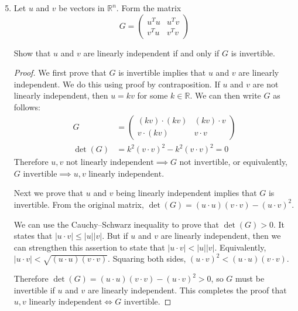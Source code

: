 \documentclass{article}
\newcommand{\Real}{\mathbb{R}}
\begin{document}
\begin{enumerate}

\setcounter{enumi}{4}
\item Let $u$ and $v$ be vectors in $\Real^n$. Form the matrix
\[ G = \left(
\begin{array}{cc}
u^T u & u^T v \\
v^T u & v^T v
\end{array}
\right) \]

Show that $u$ and $v$ are linearly independent if and only if $G$ is invertible.

\begin{proof}
We first prove that $G$ is invertible implies that $u$ and $v$ are linearly independent. We do this using proof by contraposition. If $u$ and $v$ are not linearly independent, then $u = kv$ for some $k \in \Real$. We can then write $G$ as follows:
\begin{align*}
G &= \left(
\begin{array}{cc}
(kv) \cdot (kv) & (kv) \cdot v \\
v \cdot (kv) & v \cdot v
\end{array}
\right) \\
\det(G) &= k^2 (v \cdot v)^2 - k^2 (v \cdot v)^2 = 0
\end{align*}
Therefore $u,v \mbox{ not linearly independent} \implies G \mbox{ not invertible}$, or equivalently, $G \mbox{ invertible} \implies u,v \mbox{ linearly independent}$.

Next we prove that $u$ and $v$ being linearly independent implies that $G$ is invertible. From the original matrix, $\det(G) = (u \cdot u) (v \cdot v) - (u \cdot v)^2$.

We can use the Cauchy--Schwarz inequality to prove that $\det(G) > 0$. It states that $|u \cdot v| \leq |u| |v|$. But if $u$ and $v$ are linearly independent, then we can strengthen this assertion to state that $|u \cdot v| < |u| |v|$. Equivalently, $|u \cdot v| < \sqrt{(u \cdot u)(v \cdot v)}$. Squaring both sides, $(u \cdot v)^2 < (u \cdot u)(v \cdot v)$.

Therefore $\det(G) = (u \cdot u) (v \cdot v) - (u \cdot v)^2 > 0$, so $G$ must be invertible if $u$ and $v$ are linearly independent. This completes the proof that $u,v \mbox{ linearly independent} \iff G \mbox{ invertible}$.
\end{proof}

\end{enumerate}
\end{document}
